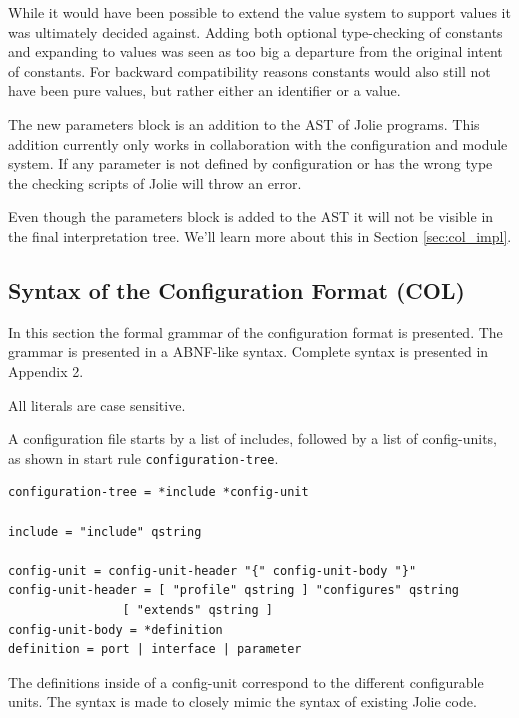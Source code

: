 While it would have been possible to extend the value system to support values
it was ultimately decided against. Adding both optional type-checking of
constants and expanding to values was seen as too big a departure from the
original intent of constants. For backward compatibility reasons constants
would also still not have been pure values, but rather either an identifier or
a value.

The new parameters block is an addition to the AST of Jolie programs. This
addition currently only works in collaboration with the configuration and
module system. If any parameter is not defined by configuration or has the
wrong type the checking scripts of Jolie will throw an error.

Even though the parameters block is added to the AST it will not be visible in
the final interpretation tree. We'll learn more about this in Section
\ref{sec:col_impl}.



\subsection{Syntax of the Configuration Format (COL)}

In this section the formal grammar of the configuration format is presented.
The grammar is presented in a ABNF-like syntax. Complete syntax is presented in
Appendix 2.

All literals are case sensitive.

A configuration file starts by a list of includes, followed by a list of
config-units, as shown in start rule \texttt{configuration-tree}.

\begin{verbatim}
configuration-tree = *include *config-unit

include = "include" qstring

config-unit = config-unit-header "{" config-unit-body "}"
config-unit-header = [ "profile" qstring ] "configures" qstring
                [ "extends" qstring ]
config-unit-body = *definition
definition = port | interface | parameter
\end{verbatim}

The definitions inside of a config-unit correspond to the different
configurable units. The syntax is made to closely mimic the syntax of existing
Jolie code.

